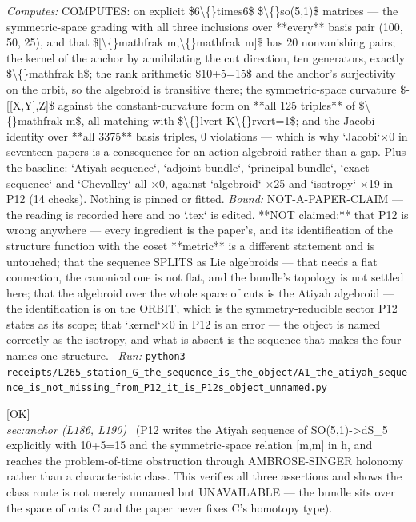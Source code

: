 \begin{description}
\emph{Computes:} COMPUTES: on explicit \$6\textbackslash\{\}times6\$ \$\textbackslash\{\}so(5,1)\$ matrices --- the symmetric-space grading with all three inclusions over **every** basis pair (100, 50, 25), and that \$[\textbackslash\{\}mathfrak m,\textbackslash\{\}mathfrak m]\$ has 20 nonvanishing pairs; the kernel of the anchor by annihilating the cut direction, ten generators, exactly \$\textbackslash\{\}mathfrak h\$; the rank arithmetic \$10+5=15\$ and the anchor's surjectivity on the orbit, so the algebroid is transitive there; the symmetric-space curvature \$-[[X,Y],Z]\$ against the constant-curvature form on **all 125 triples** of \$\textbackslash\{\}mathfrak m\$, all matching with \$\textbackslash\{\}lvert K\textbackslash\{\}rvert=1\$; and the Jacobi identity over **all 3375** basis triples, 0 violations --- which is why `Jacobi`\ensuremath{\times}0 in seventeen papers is a consequence for an action algebroid rather than a gap. Plus the baseline: `Atiyah sequence`, `adjoint bundle`, `principal bundle`, `exact sequence` and `Chevalley` all \ensuremath{\times}0, against `algebroid` \ensuremath{\times}25 and `isotropy` \ensuremath{\times}19 in P12 (14 checks). Nothing is pinned or fitted.
 \emph{Bound:} NOT-A-PAPER-CLAIM --- the reading is recorded here and no `.tex` is edited. **NOT claimed:** that P12 is wrong anywhere --- every ingredient is the paper's, and its identification of the structure function with the coset **metric** is a different statement and is untouched; that the sequence SPLITS as Lie algebroids --- that needs a flat connection, the canonical one is not flat, and the bundle's topology is not settled here; that the algebroid over the whole space of cuts is the Atiyah algebroid --- the identification is on the ORBIT, which is the symmetry-reducible sector P12 states as its scope; that `kernel`\ensuremath{\times}0 in P12 is an error --- the object is named correctly as the isotropy, and what is absent is the sequence that makes the four names one structure.
\ \emph{Run:} \texttt{python3 receipts/L265\_station\_G\_the\_sequence\_is\_the\_object/A1\_the\_atiyah\_sequence\_is\_not\_missing\_from\_P12\_it\_is\_P12s\_object\_unnamed.py}
\item[\rcptlabel{I55_the_atiyah_sequence_is_exact_and_a_characteristic_class_is_not_available}{P12R19}\textbf{P12R19}\quad\texttt{I55\_the\_atiyah\_sequence\_is\_exact\_and\_a\_characteristic\_class\_is\_not\_available}]\hfill\textsf{[OK]}\\
\textit{sec:anchor (L186, L190)} \ (P12 writes the Atiyah sequence of SO(5,1)->dS\_5 explicitly with 10+5=15 and the symmetric-space relation [m,m] in h, and reaches the problem-of-time obstruction through AMBROSE-SINGER holonomy rather than a characteristic class. This verifies all three assertions and shows the class route is not merely unnamed but UNAVAILABLE --- the bundle sits over the space of cuts C and the paper never fixes C's homotopy type). 

\end{description}
